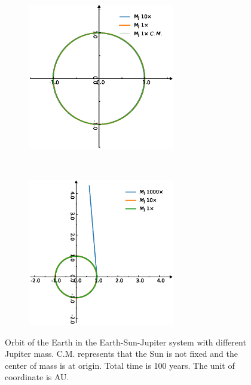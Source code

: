 \begin{figure}[tb]
	\begin{subfigure}[tb]{0.5\textwidth}
		\centering
		\includegraphics[width=0.7\textwidth]{SEJ_CM.eps}
		\caption{}
		\label{fig:leftthree}
	\end{subfigure}
	~
	\begin{subfigure}[tb]{0.5\textwidth}
		\centering
		\includegraphics[width=0.7\textwidth]{SEJ.eps}
		\caption{}
		\label{fig:rightthree}
	\end{subfigure}
	\caption{Orbit of the Earth in the Earth-Sun-Jupiter system with different Jupiter mass. 
	C.M. represents that the Sun is not fixed and the center of mass is at origin. 
	Total time is 100 years. The unit of coordinate is AU. }
	\label{fig:threebody}
\end{figure}
\par
